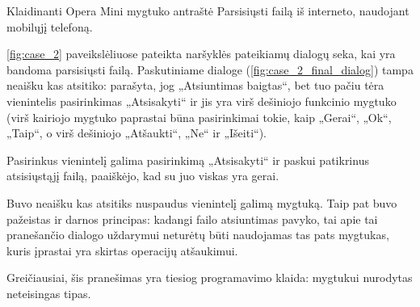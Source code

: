 \begin{xcase}{Klaidinanti Opera Mini mygtuko antraštė}
  \xcgoal
  {
    Parsisiųsti failą iš interneto, naudojant mobilųjį telefoną.
  }
  
  \xctools
  {
    \ref{fig:case_2} paveikslėliuose pateikta naršyklės pateikiamų dialogų
    seka, kai yra bandoma parsisiųsti failą. Paskutiniame dialoge
    (\ref{fig:case_2_final_dialog}) tampa neaišku kas atsitiko: parašyta,
    jog „Atsiuntimas baigtas“, bet tuo pačiu tėra vienintelis
    pasirinkimas „Atsisakyti“ ir jis yra virš dešiniojo funkcinio
    mygtuko (virš kairiojo mygtuko paprastai būna pasirinkimai tokie,
    kaip „Gerai“, „Ok“, „Taip“, o virš dešiniojo „Atšaukti“,
    „Ne“ ir „Išeiti“).
    
    {
    }
  }
  
  \xcresult
  {
    Pasirinkus vienintelį galima pasirinkimą „Atsisakyti“ ir paskui patikrinus
    atsisiųstąjį failą, paaiškėjo, kad su juo viskas yra gerai.
  }
  
  \xcprinciples
  {
    {
      Buvo neaišku kas
      atsitiks nuspaudus vienintelį galimą mygtuką. Taip pat buvo pažeistas
      ir darnos principas: kadangi failo atsiuntimas pavyko, tai apie tai
      pranešančio dialogo uždarymui neturėtų būti naudojamas tas pats
      mygtukas, kuris įprastai yra skirtas operacijų atšaukimui.
    }
  }
  
  \xcthoughts
  {
    Greičiausiai, šis pranešimas yra tiesiog programavimo klaida: mygtukui
    nurodytas neteisingas tipas.
  }
\end{xcase}
